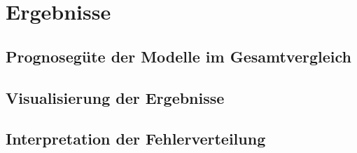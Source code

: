 \newpage

\section{Ergebnisse}
\label{sec:ergebnisse}

\subsection{Prognosegüte der Modelle im Gesamtvergleich}
\label{subsec:prognosevergleich}

\subsection{Visualisierung der Ergebnisse}
\label{subsec:visualisierung}

\subsection{Interpretation der Fehlerverteilung}
\label{subsec:fehlerinterpretation}